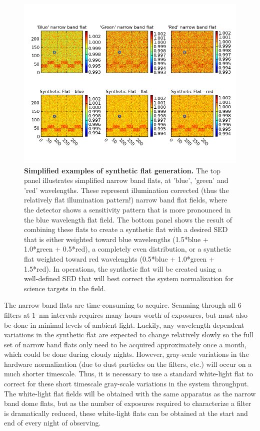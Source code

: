 \documentclass[12pt,preprint]{aastex}
\begin{document}
\begin{figure}[htbp]
\includegraphics[width=6in]{narrowband_flat}
\caption{ {\small
{\bf Simplified examples of synthetic flat generation.} 
The top panel illustrates simplified narrow band flats, at 'blue',
'green' and 'red' wavelengths. These represent illumination corrected
(thus the relatively flat illumination pattern!) narrow band flat
fields, where the detector shows a sensitivity pattern that is more
pronounced in the blue wavelength flat field. The bottom panel shows
the result of combining these flats to create a synthetic flat with a
desired SED that is either weighted toward blue wavelengths (1.5*blue
+ 1.0*green + 0.5*red), a completely even distribution, or a synthetic
flat weighted toward red wavelenghts (0.5*blue + 1.0*green + 1.5*red).
In operations, the synthetic flat will be created using a well-defined
SED that will best correct the system normalization for science
targets in the field.
\label{fig:narrowband}
} }
\end{figure}

The narrow band flats are time-consuming to acquire. Scanning through
all 6 filters at 1~nm intervals requires many hours worth of
exposures, but must also be done in minimal levels of ambient
light. Luckily, any wavelength dependent variations in the synthetic
flat are expected to change relatively slowly so the full set of
narrow band flats only need to be acquired approximately once a month,
which could be done during cloudy nights. However, gray-scale
variations in the hardware normalization (due to dust particles on the
filters, etc.) will occur on a much shorter timescale.  Thus, it is
necessary to use a standard white-light flat to correct for these
short timescale gray-scale variations in the system throughput.  The
white-light flat fields will be obtained with the same apparatus as
the narrow band dome flats, but as the number of exposures required to
characterize a filter is dramatically reduced, these white-light flats
can be obtained at the start and end of every night of observing.
\end{document}
